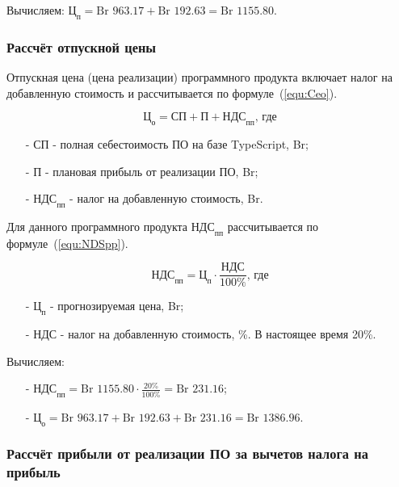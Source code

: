 Вычисляем: $\text{Ц}_\text{п} = \text{Br }963.17 + \text{Br }192.63 = \text{Br }1155.80$.

\subsubsection*{Рассчёт отпускной цены}

Отпускная цена (цена реализации) программного продукта включает налог на добавленную стоимость и рассчитывается по формуле~(\ref{equ:Ceo}).

\begin{equation}
    \label{equ:Ceo}
    \text{Ц}_\text{о} = \text{СП} + \text{П} + \text{НДС}_\text{пп} \text{, где}
\end{equation}

\begin{enumerate}
    \item[-] $\text{СП}$ - полная себестоимость ПО на базе TypeScript, Br;
    \item[-] $\text{П}$ - плановая прибыль от реализации ПО, Br;
    \item[-] $\text{НДС}_\text{пп}$ - налог на добавленную стоимость, Br.
\end{enumerate}

Для данного программного продукта $\text{НДС}_\text{пп}$ рассчитывается по формуле~(\ref{equ:NDSpp}).

\begin{equation}
    \label{equ:NDSpp}
    \text{НДС}_\text{пп} = \text{Ц}_\text{п} \cdot \frac{ \text{НДС} }{ 100\% } \text{, где}
\end{equation}

\begin{enumerate}
    \item[-] $\text{Ц}_\text{п}$ - прогнозируемая цена, Br;
    \item[-] $\text{НДС}$ - налог на добавленную стоимость, \%. В настоящее время 20\%.
\end{enumerate}

Вычисляем:
\begin{enumerate}
    \item[-] $\text{НДС}_\text{пп} = \text{Br }1155.80 \cdot \frac{ 20\% }{ 100\% } = \text{Br } 231.16$;
    \item[-] $\text{Ц}_\text{о} = \text{Br }963.17 + \text{Br }192.63 + \text{Br }231.16 = \text{Br }1386.96$.
\end{enumerate}

\subsubsection*{Рассчёт прибыли от реализации ПО за вычетов налога на прибыль}

